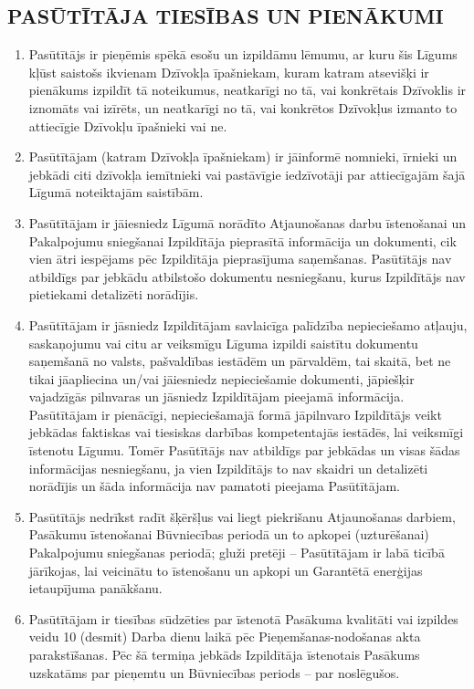 \begin{multicols}{2}
\subsection{PASŪTĪTĀJA TIESĪBAS UN PIENĀKUMI}
\begin{enumerate}
	\item Pasūtītājs ir pieņēmis spēkā esošu un izpildāmu lēmumu, ar kuru šis Līgums kļūst saistošs ikvienam Dzīvokļa īpašniekam, kuram katram atsevišķi ir pienākums izpildīt tā noteikumus, neatkarīgi no tā, vai konkrētais Dzīvoklis ir iznomāts vai izīrēts, un neatkarīgi no tā, vai konkrētos Dzīvokļus izmanto to attiecīgie Dzīvokļu īpašnieki vai ne.
	\item Pasūtītājam (katram Dzīvokļa īpašniekam) ir jāinformē nomnieki, īrnieki un jebkādi citi dzīvokļa iemītnieki vai pastāvīgie iedzīvotāji par attiecīgajām šajā Līgumā noteiktajām saistībām.
	\item Pasūtītājam ir jāiesniedz Līgumā norādīto Atjaunošanas darbu īstenošanai un Pakalpojumu sniegšanai Izpildītāja pieprasītā informācija un dokumenti, cik vien ātri iespējams pēc  Izpildītāja pieprasījuma saņemšanas. Pasūtītājs nav atbildīgs par jebkādu atbilstošo dokumentu nesniegšanu, kurus Izpildītājs nav pietiekami detalizēti norādījis.
	\item Pasūtītājam ir jāsniedz Izpildītājam savlaicīga palīdzība nepieciešamo atļauju, saskaņojumu vai citu ar veiksmīgu Līguma izpildi saistītu dokumentu saņemšanā no valsts, pašvaldības iestādēm un pārvaldēm, tai skaitā, bet ne tikai jāapliecina un/vai jāiesniedz nepieciešamie dokumenti, jāpiešķir vajadzīgās pilnvaras un jāsniedz Izpildītājam pieejamā informācija. Pasūtītājam ir pienācīgi, nepieciešamajā formā jāpilnvaro Izpildītājs veikt jebkādas faktiskas vai tiesiskas darbības kompetentajās iestādēs, lai veiksmīgi īstenotu Līgumu. Tomēr Pasūtītājs nav atbildīgs par jebkādas un visas šādas informācijas nesniegšanu, ja vien Izpildītājs to nav skaidri un detalizēti norādījis un šāda informācija nav pamatoti pieejama Pasūtītājam.
	\item Pasūtītājs nedrīkst radīt šķēršļus vai liegt piekrišanu Atjaunošanas darbiem, Pasākumu īstenošanai Būvniecības periodā un to apkopei (uzturēšanai) Pakalpojumu sniegšanas periodā; gluži pretēji – Pasūtītājam ir labā ticībā jārīkojas, lai veicinātu to īstenošanu un apkopi un Garantētā enerģijas ietaupījuma panākšanu.
	\item Pasūtītājam ir tiesības sūdzēties par īstenotā Pasākuma kvalitāti vai izpildes veidu 10 (desmit) Darba dienu laikā pēc Pieņemšanas-nodošanas akta parakstīšanas. Pēc šā termiņa jebkāds Izpildītāja īstenotais Pasākums uzskatāms par pieņemtu un Būvniecības periods – par noslēgušos.

\end{enumerate}
\end{multicols}
